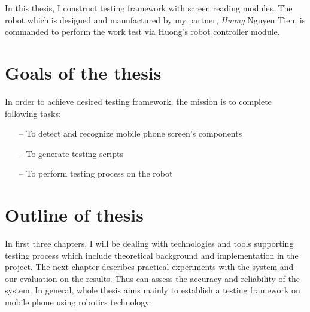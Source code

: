 In this thesis, I construct testing framework with screen reading modules. The robot which is designed and manufactured by my partner, \textit{Huong} Nguyen Tien, is commanded to perform the work test via Huong's robot controller module.

\section{Goals of the thesis}
In order to achieve desired testing framework, the mission is to complete following tasks:
	\begin{itemize}
		\item[--] To detect and recognize mobile phone screen's components
		\item[--] To generate testing scripts
		\item[--] To perform testing process on the robot
	\end{itemize}

\section{Outline of thesis}
In first three chapters, I will be dealing with technologies and tools supporting testing process which include theoretical background and implementation in the project.
The next chapter describes practical experiments with the system and our evaluation on the results. Thus can assess the accuracy and reliability of the system.
In general, whole thesis aims mainly to establish a testing framework on mobile phone using robotics technology.